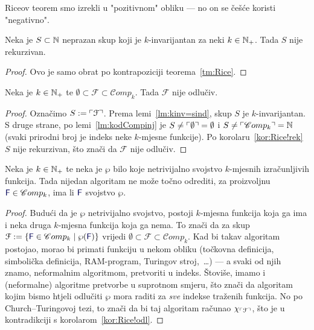 Riceov teorem smo izrekli u "pozitivnom" obliku --- no on se češće koristi "negativno".

\begin{korolar}[{name=[nerekurzivnost netrivijalnog $k$-invarijantnog skupa brojeva]}]\label{kor:Rice!rek}
Neka je $S\subset{\mathbb N}$ neprazan skup koji je $k$-invarijantan za neki $k\in{\mathbb N}_+$. Tada $S$ nije rekurzivan.
\end{korolar}
\begin{proof}
Ovo je samo obrat po kontrapoziciji teorema~\ref{tm:Rice}.
\end{proof}

\begin{korolar}[{name=[neodlučivost netrivijalnog skupa izračunljivih funkcija]}]\label{kor:Rice!odl}
Neka je $k\in{\mathbb N}_+$ te $\emptyset\subset\mathcal F\subset\mathscr Comp_k$. Tada $\mathcal F$ nije odlučiv.
\end{korolar}
\begin{proof}
    Označimo $S:=\ulcorner\mathcal F\urcorner$. Prema lemi~\ref{lm:kinv=sind}, skup $S$ je $k$-invarijantan. S druge strane, po lemi~\ref{lm:kodCompinj} je $S\ne\ulcorner\emptyset\urcorner=\emptyset$ i $S\ne\ulcorner\mathscr Comp_k\urcorner={\mathbb N}$ (svaki prirodni broj je indeks neke $k$-mjesne funkcije). Po korolaru~\ref{kor:Rice!rek} $S$ nije rekurzivan, što znači da $\mathcal F$ nije odlučiv.
\end{proof}

\begin{korolar}[{name=[neodlučivost netrivijalnih semantičkih svojstava]}]
Neka je $k\in{\mathbb N}_+$ te neka je $\wp$ bilo koje netrivijalno svojstvo $k$-mjesnih izračunljivih funkcija. Tada nijedan algoritam ne može točno odrediti, za proizvoljnu $\f F\in\mathscr Comp_k$, ima li $\f F$ svojstvo $\wp$.
\end{korolar}
\begin{proof}
Budući da je $\wp$ netrivijalno svojstvo, postoji $k$-mjesna funkcija koja ga ima i neka druga $k$-mjesna funkcija koja ga nema. To znači da za skup $\mathcal F:=\{\f F\in\mathscr Comp_k\mid\wp(\f F)\}$ vrijedi $\emptyset\subset\mathcal F\subset\mathscr Comp_k$. Kad bi takav algoritam postojao, morao bi primati funkciju u nekom obliku (točkovna definicija, simbolička definicija, RAM-program, Turingov stroj,~\ldots) --- a svaki od njih znamo, neformalnim algoritmom, pretvoriti u indeks. Štoviše, imamo i (neformalne) algoritme pretvorbe u suprotnom smjeru, što znači da algoritam kojim bismo htjeli odlučiti $\wp$ mora raditi za \emph{sve} indekse traženih funkcija.
No po Church--\!Turingovoj tezi, to znači da bi taj algoritam računao $\chi_{\ulcorner\mathcal F\urcorner}$, što je u kontradikciji s korolarom~\ref{kor:Rice!odl}.
\end{proof}

